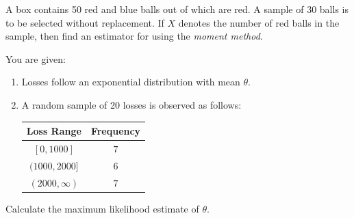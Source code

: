 \begin{mdframed}
    \begin{Exercise}
        A box contains 50 red and blue balls out of which are red. A sample
 of 30 balls is to be selected without replacement. If $X$ denotes the number
 of red balls in the sample, then find an estimator for using the \textit{moment
 method}.
    \end{Exercise}

    \begin{Exercise}
        You are given:
        \begin{enumerate}
            \item Losses follow an exponential distribution with mean $\theta$.
            \item A random sample of 20 losses is observed as follows:
            \begin{center}
                \begin{tabular}{|c|c|}
                    \hline
                    Loss Range & Frequency\\
                    \hline
                    $[0,1000]$ & $7$\\
                    $(1000, 2000]$ & $6$\\
                    $(2000, \infty)$ & $7$\\
                    \hline
                \end{tabular}
            \end{center}
        \end{enumerate}
        Calculate the maximum likelihood estimate of $\theta$.
    \end{Exercise}
\end{mdframed}